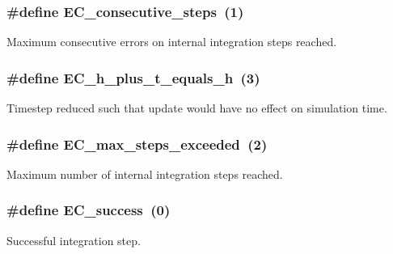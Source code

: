 \subsubsection[{\texorpdfstring{E\+C\+\_\+consecutive\+\_\+steps}{EC_consecutive_steps}}]{\setlength{\rightskip}{0pt plus 5cm}\#define E\+C\+\_\+consecutive\+\_\+steps~(1)}\hypertarget{group__exp4__ErrCodes_gae0287841c08f86f5709660fd731615ad}{}\label{group__exp4__ErrCodes_gae0287841c08f86f5709660fd731615ad}


Maximum consecutive errors on internal integration steps reached. 

\subsubsection[{\texorpdfstring{E\+C\+\_\+h\+\_\+plus\+\_\+t\+\_\+equals\+\_\+h}{EC_h_plus_t_equals_h}}]{\setlength{\rightskip}{0pt plus 5cm}\#define E\+C\+\_\+h\+\_\+plus\+\_\+t\+\_\+equals\+\_\+h~(3)}\hypertarget{group__exp4__ErrCodes_ga9326efd544880e2683c4453365ca2704}{}\label{group__exp4__ErrCodes_ga9326efd544880e2683c4453365ca2704}


Timestep reduced such that update would have no effect on simulation time. 

\subsubsection[{\texorpdfstring{E\+C\+\_\+max\+\_\+steps\+\_\+exceeded}{EC_max_steps_exceeded}}]{\setlength{\rightskip}{0pt plus 5cm}\#define E\+C\+\_\+max\+\_\+steps\+\_\+exceeded~(2)}\hypertarget{group__exp4__ErrCodes_ga0f0275d9851ab5c19b79a963d5084df3}{}\label{group__exp4__ErrCodes_ga0f0275d9851ab5c19b79a963d5084df3}


Maximum number of internal integration steps reached. 

\subsubsection[{\texorpdfstring{E\+C\+\_\+success}{EC_success}}]{\setlength{\rightskip}{0pt plus 5cm}\#define E\+C\+\_\+success~(0)}\hypertarget{group__exp4__ErrCodes_gabd83bc0f9f475a2189a4db4a08b790ca}{}\label{group__exp4__ErrCodes_gabd83bc0f9f475a2189a4db4a08b790ca}


Successful integration step. 

